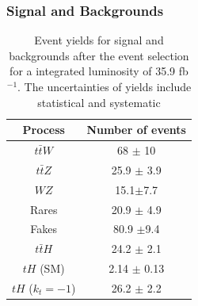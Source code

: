 \documentclass[11pt]{beamer}
\begin{document}
\begin{frame}
\frametitle{Signal and Backgrounds}
\begin{table}
	\centering
	\caption*{{Event yields for signal and backgrounds after the event selection for a integrated luminosity of 35.9 fb$^{-1}$.
			The uncertainties of yields include statistical and systematic \cite{2}}} 
	\begin{tabular}{cc}
		\hline
		Process & Number of events \\
		\hline
		$t\bar{t}W$ & 68 $\pm$ 10 \\
		$t\bar{t}Z$ & 25.9 $\pm$ 3.9\\
		$WZ$ & 15.1$\pm$7.7\\
		Rares & 20.9 $\pm$ 4.9\\
		Fakes & 80.9 $\pm$9.4\\
		$t\bar{t}H$ & 24.2 $\pm$ 2.1 \\
		\hline
		$tH$ (SM) & 2.14 $\pm$ 0.13\\
		$tH$ ($k_t=-1$) &26.2 $\pm$ 2.2
	\end{tabular}	
	\label{tth-table}
\end{table}
\end{frame}
\end{document}
